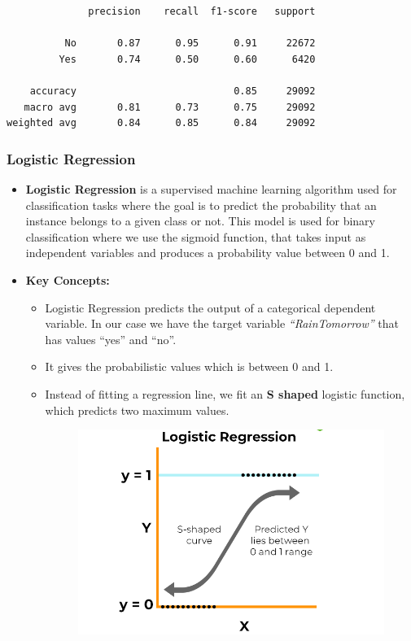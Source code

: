 \documentclass[
  letterpaper,
  DIV=11,
  numbers=noendperiod]{scrartcl}
\begin{document}
\begin{verbatim}
              precision    recall  f1-score   support

          No       0.87      0.95      0.91     22672
         Yes       0.74      0.50      0.60      6420

    accuracy                           0.85     29092
   macro avg       0.81      0.73      0.75     29092
weighted avg       0.84      0.85      0.84     29092
\end{verbatim}

\hypertarget{logistic-regression}{%
\subsubsection{Logistic Regression}\label{logistic-regression}}

\begin{itemize}
\item
  \textbf{Logistic Regression} is a supervised machine learning
  algorithm used for classification tasks where the goal is to predict
  the probability that an instance belongs to a given class or not. This
  model is used for binary classification where we use the sigmoid
  function, that takes input as independent variables and produces a
  probability value between 0 and 1.
\item
  \textbf{Key Concepts:}

  \begin{itemize}
  \item
    Logistic Regression predicts the output of a categorical dependent
    variable. In our case we have the target variable
    \emph{``RainTomorrow''} that has values ``yes'' and ``no''.
  \item
    It gives the probabilistic values which is between 0 and 1.
  \item
    Instead of fitting a regression line, we fit an \textbf{S shaped}
    logistic function, which predicts two maximum values.

    \begin{figure}

    {\centering \includegraphics{LogRegPicture.png}

}
\end{figure}
\end{itemize}
\end{itemize}
\end{document}
